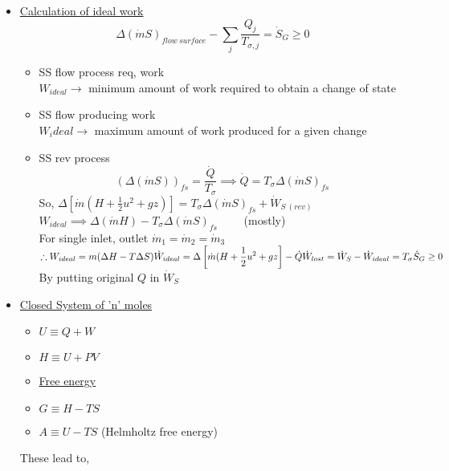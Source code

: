 \documentclass[12pt]{article}
\begin{document}
\begin{itemize}
	\item\underline{Calculation of ideal work}
	\[ \Delta(\dot m S)_{flow\ surface}-\sum_j\frac{Q_j}{T_{\sigma,j}}=\dot S_G\geq0\]
	\begin{itemize}
		\item SS flow process req, work\\
		$W_{ideal} \rightarrow$ minimum amount of work required to obtain a change of state
		\item SS flow producing work\\
		$W_ideal \rightarrow$ maximum amount of work produced for a given change
		\item SS rev process\\
		\[ (\Delta(\dot mS))_{fs}=\frac{\dot Q}{T_\sigma}\implies \dot Q=T_\sigma\Delta(\dot mS)_{fs}\]
		So, $\displaystyle \Delta\left[\dot m\left(H+\frac{1}{2}u^2+gz \right) \right] = T_\sigma\Delta(\dot mS)_{fs}+\dot W_{S\ (rev)}$\\
		$W_{ideal}\implies \Delta(\dot mH)-T_\sigma\Delta(\dot mS)_{fs}$ \ \ \ \ (mostly)\\
		For single inlet, outlet $\dot m_1 = \dot m_2 = \dot m_3$\\
		$\therefore W_{ideal} = m(\Delta H-T\Delta S)\\
		\displaystyle \dot W_{ideal}= \Delta\left[\dot m(H+\frac{1}{2}u^2+gz\right]-\dot Q\\
		\dot W_{lost}=\dot W_S-\dot W_{ideal}=T_\sigma\dot S_G\geq 0$ By putting original $Q$ in $\dot W_S$
	\end{itemize}
	\item \underline{Closed System of 'n' moles}
	\begin{itemize}
		\item $U\equiv Q+W$
		\item $H\equiv U+PV$
		\item \underline{Free energy}
		\item $G\equiv H-TS$
		\item $A\equiv U-TS$ (Helmholtz free energy)
	\end{itemize}
	These lead to,
\end{itemize}
\end{document}
